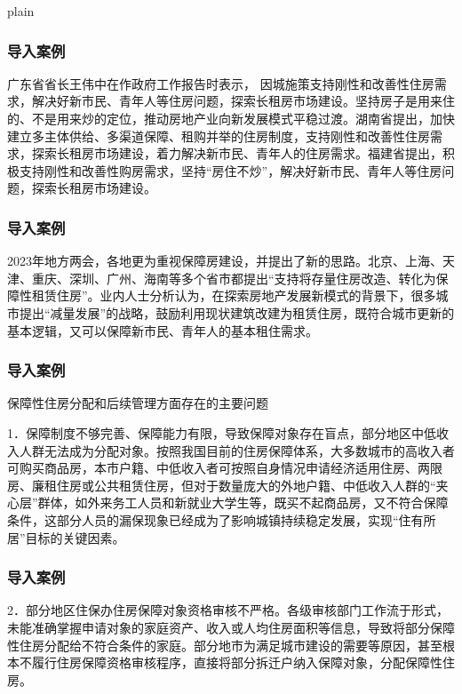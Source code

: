 \documentclass[aspectratio=169, 12pt]{beamer}
\begin{document}
\begin{frame}{plain}
    \frametitle{导入案例}
    广东省省长王伟中在作政府工作报告时表示，
    因城施策支持刚性和改善性住房需求，解决好新市民、青年人等住房问题，探索长租房市场建设。坚持房子是用来住的、不是用来炒的定位，推动房地产业向新发展模式平稳过渡。湖南省提出，加快建立多主体供给、多渠道保障、租购并举的住房制度，支持刚性和改善性住房需求，探索长租房市场建设，着力解决新市民、青年人的住房需求。福建省提出，积极支持刚性和改善性购房需求，坚持“房住不炒”，解决好新市民、青年人等住房问题，探索长租房市场建设。
\end{frame}

\begin{frame}[plain]
    \frametitle{导入案例}
    2023年地方两会，各地更为重视保障房建设，并提出了新的思路。北京、上海、天津、重庆、深圳、广州、海南等多个省市都提出“支持将存量住房改造、转化为保障性租赁住房”。业内人士分析认为，在探索房地产发展新模式的背景下，很多城市提出“减量发展”的战略，鼓励利用现状建筑改建为租赁住房，既符合城市更新的基本逻辑，又可以保障新市民、青年人的基本租住需求。
\end{frame}

\begin{frame}[plain]
    \frametitle{导入案例}
    保障性住房分配和后续管理方面存在的主要问题 \par
    1．保障制度不够完善、保障能力有限，导致保障对象存在盲点，部分地区中低收入人群无法成为分配对象。按照我国目前的住房保障体系，大多数城市的高收入者可购买商品房，本市户籍、中低收入者可按照自身情况申请经济适用住房、两限房、廉租住房或公共租赁住房，但对于数量庞大的外地户籍、中低收入人群的“夹心层”群体，如外来务工人员和新就业大学生等，既买不起商品房，又不符合保障条件，这部分人员的漏保现象已经成为了影响城镇持续稳定发展，实现“住有所居”目标的关键因素。
\end{frame}

\begin{frame}[plain]
    \frametitle{导入案例}
    2．部分地区住保办住房保障对象资格审核不严格。各级审核部门工作流于形式，未能准确掌握申请对象的家庭资产、收入或人均住房面积等信息，导致将部分保障性住房分配给不符合条件的家庭。部分地市为满足城市建设的需要等原因，甚至根本不履行住房保障资格审核程序，直接将部分拆迁户纳入保障对象，分配保障性住房。
\end{frame}
\end{document}
